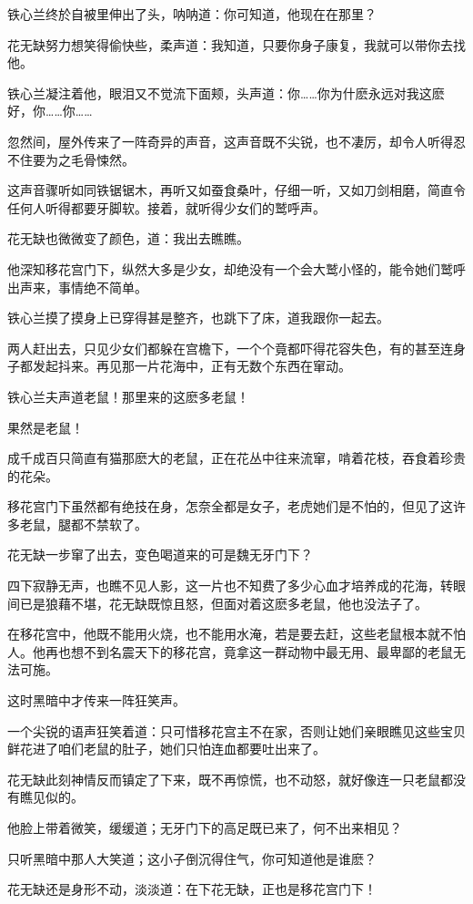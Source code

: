 \documentclass[12pt,oneside]{book}
\begin{document}
铁心兰终於自被里伸出了头，呐呐道：你可知道，他现在在那里？

花无缺努力想笑得偷快些，柔声道：我知道，只要你身子康复，我就可以带你去找他。

铁心兰凝注着他，眼泪又不觉流下面颊，头声道：你\ldots\ldots 你为什麽永远对我这麽好，你\ldots\ldots 你\ldots\ldots{}

忽然间，屋外传来了一阵奇异的声音，这声音既不尖锐，也不凄厉，却令人听得忍不住要为之毛骨悚然。

这声音骤听如同铁锯锯木，再听又如蚕食桑叶，仔细一听，又如刀剑相磨，简直令任何人听得都要牙脚软。接着，就听得少女们的鹫呼声。

花无缺也微微变了颜色，道：我出去瞧瞧。

他深知移花宫门下，纵然大多是少女，却绝没有一个会大鹫小怪的，能令她们鹫呼出声来，事情绝不简单。

铁心兰摸了摸身上已穿得甚是整齐，也跳下了床，道我跟你一起去。

两人赶出去，只见少女们都躲在宫檐下，一个个竟都吓得花容失色，有的甚至连身子都发起抖来。再见那一片花海中，正有无数个东西在窜动。

铁心兰夫声道老鼠！那里来的这麽多老鼠！

果然是老鼠！

成千成百只简直有猫那麽大的老鼠，正在花丛中往来流窜，啃着花枝，吞食着珍贵的花朵。

移花宫门下虽然都有绝技在身，怎奈全都是女子，老虎她们是不怕的，但见了这许多老鼠，腿都不禁软了。

花无缺一步窜了出去，变色喝道来的可是魏无牙门下？

四下寂静无声，也瞧不见人影，这一片也不知费了多少心血才培养成的花海，转眼间已是狼藉不堪，花无缺既惊且怒，但面对着这麽多老鼠，他也没法子了。

在移花宫中，他既不能用火烧，也不能用水淹，若是要去赶，这些老鼠根本就不怕人。他再也想不到名震天下的移花宫，竟拿这一群动物中最无用、最卑鄙的老鼠无法可施。

这时黑暗中才传来一阵狂笑声。

一个尖锐的语声狂笑着道：只可惜移花宫主不在家，否则让她们亲眼瞧见这些宝贝鲜花进了咱们老鼠的肚子，她们只怕连血都要吐出来了。

花无缺此刻神情反而镇定了下来，既不再惊慌，也不动怒，就好像连一只老鼠都没有瞧见似的。

他脸上带着微笑，缓缓道；无牙门下的高足既已来了，何不出来相见？

只听黑暗中那人大笑道；这小子倒沉得住气，你可知道他是谁麽？

花无缺还是身形不动，淡淡道：在下花无缺，正也是移花宫门下！
\end{document}

